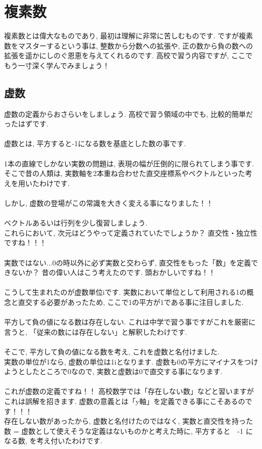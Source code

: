 \documentclass[11pt,a4paper]{jreport}
\begin{document}
\section{複素数}
複素数とは偉大なものであり, 最初は理解に非常に苦しむものです. ですが複素数をマスターするという事は, 整数から分数への拡張や, 正の数から負の数への拡張を遥かにしのぐ恩恵を与えてくれるのです. 高校で習う内容ですが, ここでもう一寸深く学んでみましょう！\\
\subsection{虚数}
虚数の定義からおさらいをしましょう. 高校で習う領域の中でも, 比較的簡単だったはずです.\\
\\
虚数とは, 平方すると-1になる数を基底とした数の事です.\\
\\
1本の直線でしかない実数の問題は, 表現の幅が圧倒的に限られてしまう事です. そこで昔の人類は, 実数軸を2本重ね合わせた直交座標系やベクトルといった考えを用いたわけです.\\
\\
しかし, 虚数の登場がこの常識を大きく変える事になりました！！\\
\\
ベクトルあるいは行列を少し復習しましょう.\\
これらにおいて, 次元はどうやって定義されていたでしょうか？ 直交性・独立性ですね！！！\\
\\
実数ではない...0の時以外に必ず実数と交わらず, 直交性をもった「数」を定義できないか？
昔の偉い人はこう考えたのです. 頭おかしいですね！！\\
\\
こうして生まれたのが虚数単位iです. 実数において単位として利用される1の概念と直交する必要があったため, ここで1の平方が1である事に注目しました. \\
\\
平方して負の値になる数は存在しない. これは中学で習う事ですがこれを厳密に言うと, 「従来の数には存在しない」と解釈したわけです.\\
\\
そこで, 平方して負の値になる数を考え, これを虚数と名付けました.\\
実数の単位が1なら, 虚数の単位は1iとなります. 虚数も0の平方にマイナスをつけようとしたところで0なので, 実数と虚数は0で直交する事になります.\\
\\
これが虚数の定義ですね！！ 高校数学では「存在しない数」などと習いますがこれは誤解を招きます. 虚数の意義とは「y軸」を定義できる事にこそあるのです！！！\\
存在しない数があったから, 虚数と名付けたのではなく, 実数と直交性を持った数 = 虚数として使えそうな定義はないものかと考えた時に, 平方すると　-1 になる数, を考え付いたわけです.
\end{document}
